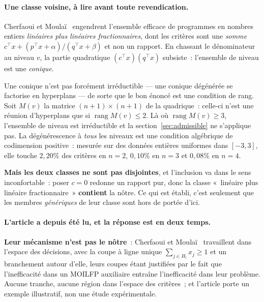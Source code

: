 \documentclass[12pt,a4paper]{report}
\theoremstyle{plain}
\theoremstyle{definition}
\begin{document}
\paragraph{Une classe voisine, à lire avant toute revendication.}
\label{sec:voisine}
Cherfaoui et Moulaï~\cite{cherfaoui2021} engendrent l'ensemble efficace de
programmes en nombres entiers \emph{linéaires plus linéaires fractionnaires},
dont les critères sont une \emph{somme} $c^{\top}x + (p^{\top}x+\alpha) /
(q^{\top}x+\beta)$ et non un rapport.  En chassant le dénominateur au niveau
$v$, la partie quadratique $(c^{\top}x)(q^{\top}x)$ subsiste~: l'ensemble de
niveau est une \emph{conique}.

Une conique n'est pas forcément irréductible --- une conique dégénérée se
factorise en hyperplans --- de sorte que le bon énoncé est une condition de
rang.  Soit $M(v)$ la matrice $(n+1) \times (n+1)$ de la quadrique~: celle-ci
n'est une réunion d'hyperplans que si $\operatorname{rang} M(v) \leqslant 2$.
Là où $\operatorname{rang} M(v) \geqslant 3$, l'ensemble de niveau est
irréductible et la section~\ref{sec:admissible} ne s'applique pas.  La
dégénérescence à \emph{tous} les niveaux est une condition algébrique de
codimension positive~: mesurée sur des données entières uniformes dans
$[-3,3]$, elle touche $2{,}20\%$ des critères en $n=2$, $0{,}10\%$ en $n=3$
et $0{,}08\%$ en $n=4$.

\textbf{Mais les deux classes ne sont pas disjointes}, et l'inclusion va dans
le sens inconfortable~: poser $c = 0$ redonne un rapport pur, donc la classe
«~linéaire plus linéaire fractionnaire~» \textbf{contient} la nôtre.  Ce qui
est établi, c'est seulement que les membres \emph{génériques} de leur classe
sont hors de portée d'ici.

\paragraph{L'article a depuis été lu, et la réponse est en deux temps.}
\textbf{Leur mécanisme n'est pas le nôtre}~: Cherfaoui et
Moula\"i~\cite{cherfaoui2021} travaillent dans l'espace des décisions, avec
la coupe à ligne unique $\sum_{j \in H_l} x_j \geqslant 1$ et un
branchement autour d'elle, leurs coupes étant justifiées par le fait que
l'inefficacité dans un MOILFP auxiliaire entraîne l'inefficacité dans leur
problème.  Aucune tranche, aucune région dans l'espace des critères~; et
l'article porte un exemple illustratif, non une étude expérimentale.
\end{document}
